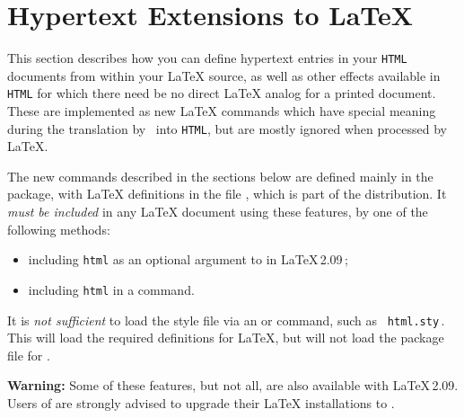 \section{Hypertext Extensions to \LaTeX}
\label{sec:hyp}

\noindent
This {section} describes how you can define hypertext 
entries in your \texttt{HTML} documents from within your \LaTeX{} source,
as well as other effects available in \texttt{HTML} for which
there need be no direct \LaTeX{} analog for a printed document.
These are implemented as new \LaTeX{} commands which have special 
meaning during the translation by \latextohtml\ into \texttt{HTML}, 
but are mostly ignored when processed by \LaTeX.

%
\html{\\}%
The new commands described in the sections 
below are defined mainly in the  package,
with \LaTeX{} definitions in the file ,
which is part of the \latextohtml{} distribution. 
It \emph{must be included} in any \LaTeX{} document using these features, 
by one of the following methods:

\begin{itemize}%
\item including \texttt{html} as an optional argument 
to  in \LaTeX\,2.09\,;
\item including \texttt{html} in a \LaTeXe{}  command.
\end{itemize}

\noindent
It is \emph{not sufficient} to load the style file via an  or
 command, such as \verb| html.sty|\,.
This will load the required definitions for \LaTeX, but will not load
the  package file for \latextohtml.

\smallskip\noindent
\textbf{Warning: } Some of these features, but not all, are also available
with \LaTeX{}\,2.09.\html{\\}
Users of \latextohtml{} are strongly advised to upgrade
their \LaTeX{} installations to \LaTeXe{}. 

